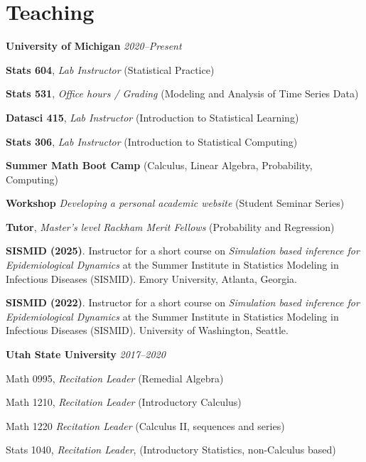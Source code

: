 \documentclass[11pt]{article}
\newenvironment {teachinglsit}
                {
                 \begin{list}{}
                 {\setlength{\labelwidth}{0mm}
                  \setlength{\leftmargin}{5mm}
                  \setlength{\labelsep}{0mm}
                  \setlength{\parsep}{0.1 ex}
                  \setlength{\itemsep}{1pt}
      \setlength{\topsep}{0.15cm}}} %
   {\end{list}}
\begin{document}
\hspace{5mm}{\it Award amount: $\$1000$}

\section*{Teaching}

\noindent \textbf{University of Michigan} \hfill  {\textit{2020--Present}}

\begin{teachinglsit}
    \item \textbf{Stats 604}, {\it Lab Instructor} \hfill (Statistical Practice)
    \item \textbf{Stats 531}, {\it Office hours / Grading} \hfill (Modeling and Analysis of Time Series Data)
    \item \textbf{Datasci 415}, {\it Lab Instructor} \hfill (Introduction to Statistical Learning)
    \item \textbf{Stats 306}, {\it Lab Instructor} \hfill (Introduction to Statistical Computing)
    \item \textbf{Summer Math Boot Camp} \hfill (Calculus, Linear Algebra, Probability, Computing)
    \item \textbf{Workshop} {\it Developing a personal academic website} \hfill (Student Seminar Series)
    \item \textbf{Tutor}, {\it Master's level Rackham Merit Fellows} \hfill (Probability and Regression)

\end{teachinglsit}

\vspace{2mm}
\noindent \textbf{SISMID (2025)}. Instructor for a short course on {\it Simulation based inference for Epidemiological Dynamics} at the Summer Institute in Statistics Modeling in Infectious Diseases (SISMID). Emory University, Atlanta, Georgia.

\vspace{2mm}
\noindent \textbf{SISMID (2022)}. Instructor for a short course on {\it Simulation based inference for Epidemiological Dynamics} at the Summer Institute in Statistics Modeling in Infectious Diseases (SISMID). University of Washington, Seattle.

\vspace{2mm}
\noindent \textbf{Utah State University} \hfill  {\textit{2017--2020}}

\begin{teachinglsit}
    \item Math 0995, {\it Recitation Leader} (Remedial Algebra)
    \item Math 1210, {\it Recitation Leader} (Introductory Calculus)
    \item Math 1220 {\it Recitation Leader} (Calculus II, sequences and series)
    \item Stats 1040, {\it Recitation Leader}, (Introductory Statistics, non-Calculus based)
\end{teachinglsit}
\end{document}
